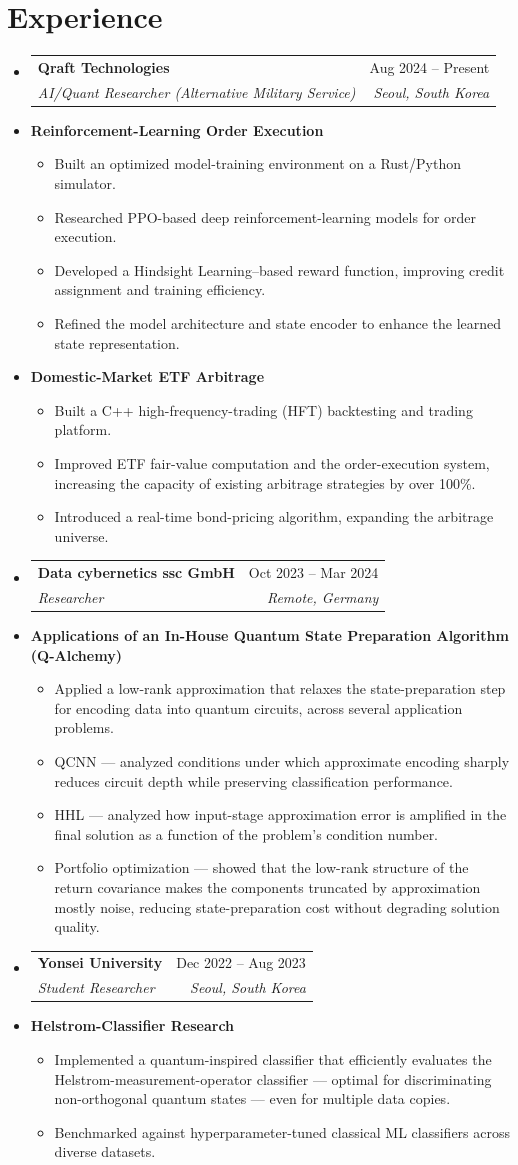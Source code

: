 \documentclass[letterpaper,11pt]{article}
\makeatletter
\newcommand{\resumeItem}[1]{
  \item{
    {#1 \vspace{-4pt}}
  }
}
\newcommand{\resumeSubheading}[4]{
  \needspace{7\baselineskip}\vspace{-2pt}\item
    \begin{tabular*}{0.97\textwidth}[t]{@{}p{0.68\textwidth}@{\extracolsep{\fill}}r@{}}
      \textbf{#1} & #2 \\
      \textit{\small #3} & \textit{\small #4} \\
    \end{tabular*}\vspace{-10pt}
}
\newcommand{\resumeProject}[1]{\needspace{4.5\baselineskip}\vspace{1pt}\item[]{\textbf{#1}}\vspace{-4pt}}
\newcommand{\resumeSubHeadingListStart}{\begin{itemize}[leftmargin=0.15in, label={}]}
\newcommand{\resumeSubHeadingListEnd}{\end{itemize}}
\newcommand{\resumeItemListStart}{\begin{itemize}}
\newcommand{\resumeItemListEnd}{\end{itemize}\vspace{-2pt}}
\makeatother
\begin{document}
\section{Experience}
\resumeSubHeadingListStart
  \resumeSubheading
    {Qraft Technologies}{Aug 2024 -- Present}
    {AI/Quant Researcher (Alternative Military Service)}{Seoul, South Korea}
    \resumeProject{Reinforcement-Learning Order Execution}
    \resumeItemListStart
      \resumeItem{Built an optimized model-training environment on a Rust/Python simulator.}
      \resumeItem{Researched PPO-based deep reinforcement-learning models for order execution.}
      \resumeItem{Developed a Hindsight Learning--based reward function, improving credit assignment and training efficiency.}
      \resumeItem{Refined the model architecture and state encoder to enhance the learned state representation.}
    \resumeItemListEnd
    \resumeProject{Domestic-Market ETF Arbitrage}
    \resumeItemListStart
      \resumeItem{Built a C++ high-frequency-trading (HFT) backtesting and trading platform.}
      \resumeItem{Improved ETF fair-value computation and the order-execution system, increasing the capacity of existing arbitrage strategies by over 100\%.}
      \resumeItem{Introduced a real-time bond-pricing algorithm, expanding the arbitrage universe.}
    \resumeItemListEnd
  \resumeSubheading
    {Data cybernetics ssc GmbH}{Oct 2023 -- Mar 2024}
    {Researcher}{Remote, Germany}
    \resumeProject{Applications of an In-House Quantum State Preparation Algorithm (Q-Alchemy)}
    \resumeItemListStart
      \resumeItem{Applied a low-rank approximation that relaxes the state-preparation step for encoding data into quantum circuits, across several application problems.}
      \resumeItem{QCNN --- analyzed conditions under which approximate encoding sharply reduces circuit depth while preserving classification performance.}
      \resumeItem{HHL --- analyzed how input-stage approximation error is amplified in the final solution as a function of the problem's condition number.}
      \resumeItem{Portfolio optimization --- showed that the low-rank structure of the return covariance makes the components truncated by approximation mostly noise, reducing state-preparation cost without degrading solution quality.}
    \resumeItemListEnd
  \resumeSubheading
    {Yonsei University}{Dec 2022 -- Aug 2023}
    {Student Researcher}{Seoul, South Korea}
    \resumeProject{Helstrom-Classifier Research}
    \resumeItemListStart
      \resumeItem{Implemented a quantum-inspired classifier that efficiently evaluates the Helstrom-measurement-operator classifier --- optimal for discriminating non-orthogonal quantum states --- even for multiple data copies.}
      \resumeItem{Benchmarked against hyperparameter-tuned classical ML classifiers across diverse datasets.}
    \resumeItemListEnd
\resumeSubHeadingListEnd
\end{document}
